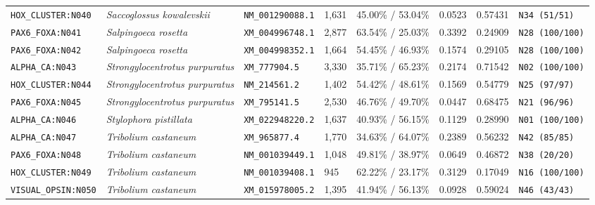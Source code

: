 \documentclass[10pt,letterpaper]{article}
\begin{document}
\begin{longtable}{llllllll}
\texttt{HOX\_CLUSTER:N040} & \textit{Saccoglossus kowalevskii} & \texttt{NM\_001290088.1} & 1,631 & 45.00\% / 53.04\% & 0.0523 & 0.57431 & \texttt{N34 (51/51)} \\
\texttt{PAX6\_FOXA:N041} & \textit{Salpingoeca rosetta} & \texttt{XM\_004996748.1} & 2,877 & 63.54\% / 25.03\% & 0.3392 & 0.24909 & \texttt{N28 (100/100)} \\
\texttt{PAX6\_FOXA:N042} & \textit{Salpingoeca rosetta} & \texttt{XM\_004998352.1} & 1,664 & 54.45\% / 46.93\% & 0.1574 & 0.29105 & \texttt{N28 (100/100)} \\
\texttt{ALPHA\_CA:N043} & \textit{Strongylocentrotus purpuratus} & \texttt{XM\_777904.5} & 3,330 & 35.71\% / 65.23\% & 0.2174 & 0.71542 & \texttt{N02 (100/100)} \\
\texttt{HOX\_CLUSTER:N044} & \textit{Strongylocentrotus purpuratus} & \texttt{NM\_214561.2} & 1,402 & 54.42\% / 48.61\% & 0.1569 & 0.54779 & \texttt{N25 (97/97)} \\
\texttt{PAX6\_FOXA:N045} & \textit{Strongylocentrotus purpuratus} & \texttt{XM\_795141.5} & 2,530 & 46.76\% / 49.70\% & 0.0447 & 0.68475 & \texttt{N21 (96/96)} \\
\texttt{ALPHA\_CA:N046} & \textit{Stylophora pistillata} & \texttt{XM\_022948220.2} & 1,637 & 40.93\% / 56.15\% & 0.1129 & 0.28990 & \texttt{N01 (100/100)} \\
\texttt{ALPHA\_CA:N047} & \textit{Tribolium castaneum} & \texttt{XM\_965877.4} & 1,770 & 34.63\% / 64.07\% & 0.2389 & 0.56232 & \texttt{N42 (85/85)} \\
\texttt{PAX6\_FOXA:N048} & \textit{Tribolium castaneum} & \texttt{NM\_001039449.1} & 1,048 & 49.81\% / 38.97\% & 0.0649 & 0.46872 & \texttt{N38 (20/20)} \\
\texttt{HOX\_CLUSTER:N049} & \textit{Tribolium castaneum} & \texttt{NM\_001039408.1} & 945 & 62.22\% / 23.17\% & 0.3129 & 0.17049 & \texttt{N16 (100/100)} \\
\texttt{VISUAL\_OPSIN:N050} & \textit{Tribolium castaneum} & \texttt{XM\_015978005.2} & 1,395 & 41.94\% / 56.13\% & 0.0928 & 0.59024 & \texttt{N46 (43/43)} \\
\bottomrule
\end{longtable}
\end{document}
